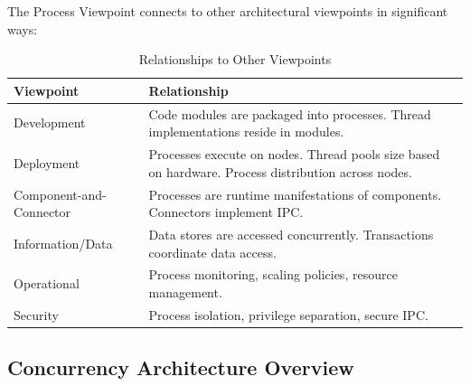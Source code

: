 \documentclass[11pt,letterpaper]{article}
\begin{document}
The Process Viewpoint connects to other architectural viewpoints in significant ways:

\begin{table}[H]
\centering
\caption{Relationships to Other Viewpoints}
\begin{tabular}{@{}L{3.5cm}L{10.5cm}@{}}
\toprule
\textbf{Viewpoint} & \textbf{Relationship} \\
\midrule
Development & Code modules are packaged into processes. Thread implementations reside in modules. \\
\addlinespace
Deployment & Processes execute on nodes. Thread pools size based on hardware. Process distribution across nodes. \\
\addlinespace
Component-and-Connector & Processes are runtime manifestations of components. Connectors implement IPC. \\
\addlinespace
Information/Data & Data stores are accessed concurrently. Transactions coordinate data access. \\
\addlinespace
Operational & Process monitoring, scaling policies, resource management. \\
\addlinespace
Security & Process isolation, privilege separation, secure IPC. \\
\bottomrule
\end{tabular}
\end{table}

\subsection{Concurrency Architecture Overview}
\end{document}
